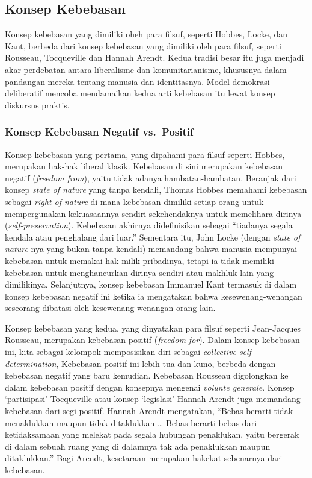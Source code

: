 \documentclass[10pt,a4paper]{article}
\renewenvironment{quote}
{\list{}{%
       \leftmargin 1.5em 
       \rightmargin 0em}
   \item\relax}
{\endlist}
\begin{document}
\begin{multicols}{2}
\hypertarget{konsep-kebebasan}{%
\subsection{Konsep Kebebasan}\label{konsep-kebebasan}}

\begin{quote}
Konsep kebebasan yang dimiliki oheh para filsuf, seperti Hobbes, Locke,
dan Kant, berbeda dari konsep kebebasan yang dimiliki oleh para filsuf,
seperti Rousseau, Tocqueville dan Hannah Arendt. Kedua tradisi besar itu
juga menjadi akar perdebatan antara liberalisme dan komunitarianisme,
khususnya dalam pandangan mereka tentang manusia dan identitasnya. Model
demokrasi deliberatif mencoba mendamaikan kedua arti kebebasan itu lewat
konsep diskursus praktis.
\end{quote}

\hypertarget{konsep-kebebasan-negatif-vs.-positif}{%
\subsubsection{Konsep Kebebasan Negatif
vs.~Positif}\label{konsep-kebebasan-negatif-vs.-positif}}

Konsep kebebasan yang pertama, yang dipahami para filsuf seperti Hobbes,
merupakan hak-hak liberal klasik. Kebebasan di sini merupakan kebebasan
negatif (\emph{freedom from}), yaitu tidak adanya hambatan-hambatan.
Beranjak dari konsep \emph{state of nature} yang tanpa kendali, Thomas
Hobbes memahami kebebasan sebagai \emph{right of nature} di mana
kebebasan dimiliki setiap orang untuk mempergunakan kekuasaannya sendiri
sekehendaknya untuk memelihara dirinya (\emph{self-preservation}).
Kebebasan akhirnya didefinisikan sebagai ``tiadanya segala kendala atau
penghalang dari luar.'' Sementara itu, John Locke (dengan \emph{state of
nature}-nya yang bukan tanpa kendali) memandang bahwa manusia mempunyai
kebebasan untuk memakai hak milik pribadinya, tetapi ia tidak memiliki
kebebasan untuk menghancurkan dirinya sendiri atau makhluk lain yang
dimilikinya. Selanjutnya, konsep kebebasan Immanuel Kant termasuk di
dalam konsep kebebasan negatif ini ketika ia mengatakan bahwa
kesewenang-wenangan seseorang dibatasi oleh kesewenang-wenangan orang
lain.

Konsep kebebasan yang kedua, yang dinyatakan para filsuf seperti
Jean-Jacques Rousseau, merupakan kebebasan positif (\emph{freedom for}).
Dalam konsep kebebasan ini, kita sebagai kelompok memposisikan diri
sebagai \emph{collective self determination}, Kebebasan positif ini
lebih tua dan kuno, berbeda dengan kebebasan negatif yang baru kemudian.
Kebebasan Rousseau digolongkan ke dalam kebebasan positif dengan
konsepnya mengenai \emph{volunte generale}. Konsep `partisipasi'
Tocqueville atau konsep `legislasi' Hannah Arendt juga memandang
kebebasan dari segi positif. Hannah Arendt mengatakan, ``Bebas berarti
tidak menaklukkan maupun tidak ditaklukkan \ldots{} Bebas berarti bebas
dari ketidaksamaan yang melekat pada segala hubungan penaklukan, yaitu
bergerak di dalam sebuah ruang yang di dalamnya tak ada penaklukkan
maupun ditaklukkan.'' Bagi Arendt, kesetaraan merupakan hakekat
sebenarnya dari kebebasan.


\end{multicols}
\end{document}
